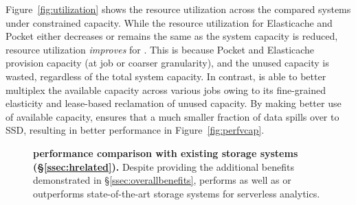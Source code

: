  Figure~\ref{fig:utilization} shows the resource utilization across the compared systems under constrained capacity. While the resource utilization for Elasticache and Pocket either decreases or remains the same as the system capacity is reduced, resource utilization \textit{improves} for \jiffy. This is because Pocket and Elasticache provision capacity (at job or coarser granularity), and the unused capacity is wasted, regardless of the total system capacity. In contrast, \jiffy is able to better multiplex the available capacity across various jobs owing to its fine-grained elasticity and lease-based reclamation of unused capacity. By making better use of available capacity, \jiffy ensures that a much smaller fraction of data spills over to SSD, resulting in better performance in Figure~\ref{fig:perfvcap}.


\begin{figure}
  \centering
  \vspace{-1.25em}
  \caption{\small{\textbf{\jiffy performance comparison with existing storage systems (\S\ref{ssec:hrelated}).} Despite providing the additional benefits demonstrated in \S\ref{ssec:overallbenefits}, \jiffy performs as well as or outperforms state-of-the-art storage systems for serverless analytics.}}
  \label{fig:storage-perf}\vspace{-1em}
\end{figure}

